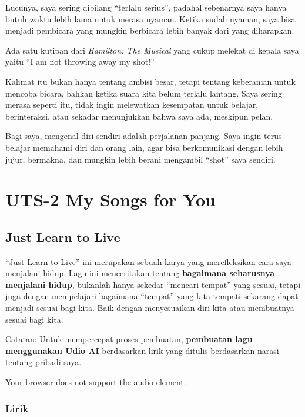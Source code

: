 \documentclass[
  letterpaper,
  DIV=11,
  numbers=noendperiod]{scrreprt}
\begin{document}
Lucunya, saya sering dibilang ``terlalu serius'', padahal sebenarnya
saya hanya butuh waktu lebih lama untuk merasa nyaman. Ketika sudah
nyaman, saya bisa menjadi pembicara yang mungkin berbicara lebih banyak
dari yang diharapkan.

Ada satu kutipan dari \emph{Hamilton: The Musical} yang cukup melekat di
kepala saya yaitu ``I am not throwing away my shot!''

Kalimat itu bukan hanya tentang ambisi besar, tetapi tentang keberanian
untuk mencoba bicara, bahkan ketika suara kita belum terlalu lantang.
Saya sering merasa seperti itu, tidak ingin melewatkan kesempatan untuk
belajar, berinteraksi, atau sekadar menunjukkan bahwa saya ada, meskipun
pelan.

Bagi saya, mengenal diri sendiri adalah perjalanan panjang. Saya ingin
terus belajar memahami diri dan orang lain, agar bisa berkomunikasi
dengan lebih jujur, bermakna, dan mungkin lebih berani mengambil
``shot'' saya sendiri.


\chapter{UTS-2 My Songs for You}\label{uts-2-my-songs-for-you}

\section{Just Learn to Live}\label{just-learn-to-live}

``Just Learn to Live'' ini merupakan sebuah karya yang merefleksikan
cara saya menjalani hidup. Lagu ini menceritakan tentang
\textbf{bagaimana seharusnya menjalani hidup}, bukanlah hanya sekedar
``mencari tempat'' yang sesuai, tetapi juga dengan mempelajari bagaimana
``tempat'' yang kita tempati sekarang dapat menjadi sesuai bagi kita.
Baik dengan menyesuaikan diri kita atau membuatnya sesuai bagi kita.

Catatan: Untuk mempercepat proses pembuatan, \textbf{pembuatan lagu
menggunakan Udio AI} berdasarkan lirik yang ditulis berdasarkan narasi
tentang pribadi saya.

Your browser does not support the audio element.

\subsection{Lirik}\label{lirik}
\end{document}
